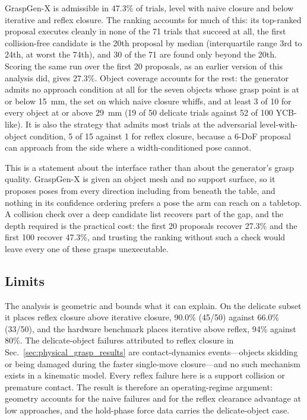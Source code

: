 GraspGen-X is admissible in 47.3\% of trials, level with naive closure and below
iterative and reflex closure. The ranking accounts for much of this: its
top-ranked proposal executes cleanly in none of the 71 trials that succeed at
all, the first collision-free candidate is the 20th proposal by median
(interquartile range 3rd to 24th, at worst the 74th), and 30 of the 71 are found
only beyond the 20th. Scoring the same run over the first 20 proposals, as an
earlier version of this analysis did, gives 27.3\%. Object coverage accounts for
the rest: the generator admits no approach condition at all for the seven objects
whose grasp point is at or below \SI{15}{\milli\metre}, the set on which naive
closure whiffs, and at least 3 of 10 for every object at or above
\SI{29}{\milli\metre} (19 of 50 delicate trials against 52 of 100 YCB-like). It
is also the strategy that admits most trials at the adversarial level-with-object
condition, 5 of 15 against 1 for reflex closure, because a 6-DoF proposal can
approach from the side where a width-conditioned pose cannot.

This is a statement about the interface rather than about the generator's grasp
quality. GraspGen-X is given an object mesh and no support surface, so it
proposes poses from every direction including from beneath the table, and nothing
in its confidence ordering prefers a pose the arm can reach on a tabletop. A
collision check over a deep candidate list recovers part of the gap, and the
depth required is the practical cost: the first 20 proposals recover 27.3\% and
the first 100 recover 47.3\%, and trusting the ranking without such a check
would leave every one of these grasps unexecutable.

\subsection{Limits}
\label{sec:nogo_limits_v2}

The analysis is geometric and bounds what it can explain. On the delicate subset
it places reflex closure above iterative closure, 90.0\% (45/50) against 66.0\%
(33/50), and the hardware benchmark places iterative above reflex, 94\% against
80\%. The
delicate-object failures attributed to reflex closure in
Sec.~\ref{sec:physical_grasp_results} are contact-dynamics events---objects
skidding or being damaged during the faster single-move closure---and no such
mechanism exists in a kinematic model. Every reflex failure here is a support
collision or premature contact. The result is therefore an operating-regime
argument: geometry accounts for the naive failures and for the reflex clearance
advantage at low approaches, and the hold-phase force data carries the
delicate-object case.

